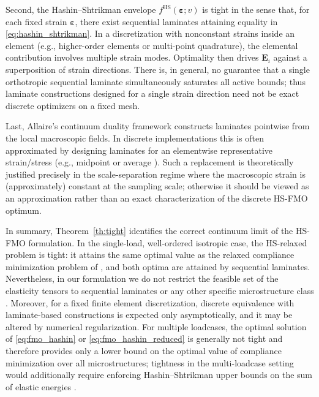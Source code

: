 \documentclass[preprint,3p]{elsarticle}
\newcommand{\tenss}[1]{\bm{\mathbf{#1}}}            %
\newcommand{\tensf}[1]{\bm{\mathbf{#1}}}            %
\newcommand{\strain}{\tenss{\varepsilon}}           %
\newcommand{\Ei}{\tensf{E}_i}                       %
\begin{document}
Second, the Hashin--Shtrikman envelope $f^{\mathrm{HS}}(\strain;v)$ is tight in the sense that, for each fixed strain $\strain$, there exist sequential laminates attaining equality in \eqref{eq:hashin_shtrikman}. In a discretization with nonconstant strains inside an element (e.g., higher-order elements or multi-point quadrature), the elemental contribution involves multiple strain modes. Optimality then drives $\Ei$ against a superposition of strain directions. There is, in general, no guarantee that a single orthotropic sequential laminate simultaneously saturates all active bounds; thus laminate constructions designed for a single strain direction need not be exact discrete optimizers on a fixed mesh.

Last, Allaire's continuum duality framework constructs laminates pointwise from the local macroscopic fields. In discrete implementations this is often approximated by designing laminates for an elementwise representative strain/stress (e.g., midpoint or average \citep{Allaire2002}). Such a replacement is theoretically justified precisely in the scale-separation regime where the macroscopic strain is (approximately) constant at the sampling scale; otherwise it should be viewed as an approximation rather than an exact characterization of the discrete HS-FMO optimum.

In summary, Theorem~\ref{th:tight} identifies the correct continuum limit of the HS-FMO formulation. In the single-load, well-ordered isotropic case, the HS-relaxed problem is tight: it attains the same optimal value as the relaxed compliance minimization problem of \citet{Allaire1993od}, and both optima are attained by sequential laminates. Nevertheless, in our formulation we do not restrict the feasible set of the elasticity tensors to sequential laminates or any other specific microstructure class \citep{Allaire1999}. Moreover, for a fixed finite element discretization, discrete equivalence with laminate-based constructions is expected only asymptotically, and it may be altered by numerical regularization. For multiple loadcases, the optimal solution of \eqref{eq:fmo_hashin} or \eqref{eq:fmo_hashin_reduced} is generally not tight and therefore provides only a lower bound on the optimal value of compliance minimization over all microstructures; tightness in the multi-loadcase setting would additionally require enforcing Hashin--Shtrikman upper bounds on the sum of elastic energies \citep{Allaire1993wo,Allaire1996,Avellaneda1987}.


\end{document}
